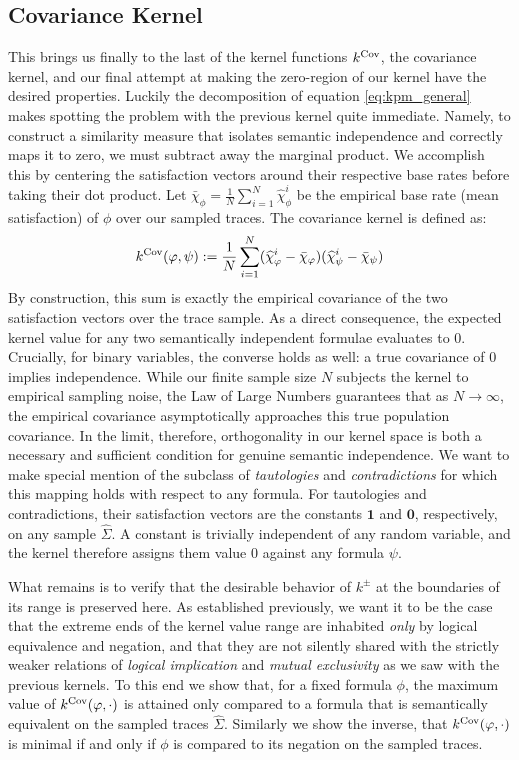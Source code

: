 \documentclass[titlepage,a4paper,11pt]{report}
\begin{document}
    \subsection{Covariance Kernel}
    This brings us finally to the last of the kernel functions $k^{\mathrm{Cov}}$, the covariance kernel, and our final attempt at making  the zero-region of our kernel have the desired properties. Luckily the decomposition of equation \eqref{eq:kpm_general} makes spotting the problem with the previous kernel quite immediate. Namely, to construct a similarity measure that isolates semantic independence and correctly maps it to zero, we must subtract away the marginal product. We accomplish this by centering the satisfaction vectors around their respective base rates before taking their dot product. Let $\bar{\chi}_\phi = \frac{1}{N}\sum_{i=1}^N \widehat{\chi}^i_\phi$ be the empirical base rate (mean satisfaction) of $\phi$ over our sampled traces. The covariance kernel is defined as:
    \begin{equation}\label{eq:covariance_kernel}
        k^{\mathrm{Cov}}(\varphi, \psi) := \frac{1}{N} \sum_{i=1}^N (\widehat{\chi}^i_\varphi - \bar{\chi}_\varphi) (\widehat{\chi}^i_\psi - \bar{\chi}_\psi)
    \end{equation}
    By construction, this sum is exactly the empirical covariance of the two satisfaction vectors over the trace sample. As a direct consequence, the expected kernel value for any two semantically independent formulae evaluates to $0$. Crucially, for binary variables, the converse holds as well: a true covariance of $0$ implies independence. While our finite sample size $N$ subjects the kernel to empirical sampling noise, the Law of Large Numbers guarantees that as $N \to \infty$, the empirical covariance asymptotically approaches this true population covariance. In the limit, therefore, orthogonality in our kernel space is both a necessary and sufficient condition for genuine semantic independence. We want to make special mention of the subclass of \textit{tautologies} and \textit{contradictions} for which this mapping holds with respect to any formula. For tautologies and contradictions, their satisfaction vectors are the constants $\mathbf{1}$ and $\mathbf{0}$, respectively, on any sample $\widehat\Sigma$. A constant is trivially independent of any random variable, and the kernel therefore assigns them value $0$ against any formula $\psi$.
    
    What remains is to verify that the desirable behavior of $k^\pm$ at the boundaries of its range is preserved here. As established previously, we want it to be the case that the extreme ends of the kernel value range are inhabited \emph{only} by logical equivalence and negation, and that they are not silently shared with the strictly weaker relations of \emph{logical implication} and \emph{mutual exclusivity} as we saw with the previous kernels. To this end we show that, for a fixed formula $\phi$, the maximum value of $k^{\mathrm{Cov}}(\varphi,\cdot)$ is attained only compared to a formula that is semantically equivalent on the sampled traces $\widehat \Sigma$. Similarly we show the inverse, that $k^{\mathrm{Cov}}(\varphi,\cdot)$ is minimal if and only if $\phi$ is compared to its negation on the sampled traces.
\end{document}
